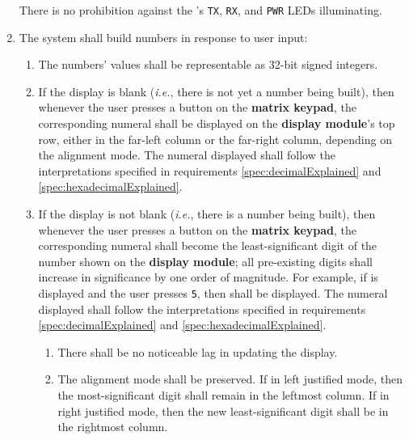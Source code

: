 \begin{enumerate}
    There is no prohibition against the \developmentboard's \texttt{TX},
    \texttt{RX}, and \texttt{PWR} LEDs illuminating.
\item The system shall build numbers in response to user input:
    \begin{enumerate}
    \item The numbers' values shall be representable as 32-bit signed integers.
    \item \label{spec:initialKeyPress} If the display is blank
        (\textit{i.e.}, there is not yet a number being built), then whenever the
        user presses a button on the \textbf{matrix keypad}, the corresponding
        numeral shall be displayed on the \textbf{display module}'s top row,
        either in the far-left column or the far-right column, depending on the
        alignment mode. The numeral displayed shall follow the interpretations
        specified in requirements \ref{spec:decimalExplained} and
        \ref{spec:hexadecimalExplained}.
    \item \label{spec:BuildingValue} If the display is not blank (\textit{i.e.},
        there is a number being built), then whenever the user presses a button
        on the \textbf{matrix keypad}, the corresponding numeral shall become
        the least-significant digit of the number shown on the
        \textbf{display module}; all pre-existing digits shall increase in
        significance by one order of magnitude. For example, if  is
        displayed and the user presses \texttt{5}, then  shall be
        displayed. The numeral displayed shall follow the interpretations
        specified in requirements \ref{spec:decimalExplained} and
        \ref{spec:hexadecimalExplained}.
        \begin{enumerate}
        \item There shall be no noticeable lag in updating the display.
        \item The alignment mode shall be preserved. If in left justified mode,
            then the most-significant digit shall remain in the leftmost column.
            If in right justified mode, then the new least-significant digit
            shall be in the rightmost column.

\end{enumerate}
\end{enumerate}
\end{enumerate}
